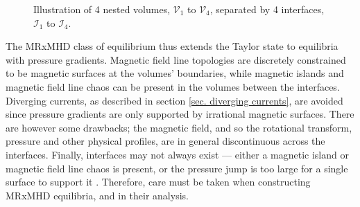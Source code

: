 \documentclass[my_thesis.tex]{subfiles}
\begin{document}
\begin{figure}
	\centering
	\caption{Illustration of 4 nested volumes, $\mathcal{V}_1$ to $\mathcal{V}_4$, separated by 4 interfaces, $\mathcal{I}_1$ to $\mathcal{I}_4$.}
	\label{fig:Illustration_SPEC}
\end{figure}

The MRxMHD class of equilibrium thus extends the Taylor state to equilibria with pressure gradients. Magnetic field line topologies are discretely constrained to be magnetic surfaces at the volumes' boundaries, while magnetic islands and magnetic field line chaos can be present in the volumes between the interfaces. Diverging currents, as described in section \ref{sec. diverging currents}, are avoided since pressure gradients are only supported by irrational magnetic surfaces. There are however some drawbacks; the magnetic field, and so the rotational transform, pressure and other physical profiles, are in general discontinuous across the interfaces. Finally, interfaces may not always exist --- either a magnetic island or magnetic field line chaos is present, or the pressure jump is too large for a single surface to support it \citep{Qu2021}. Therefore, care must be taken when constructing MRxMHD equilibria, and in their analysis. 
\end{document}
